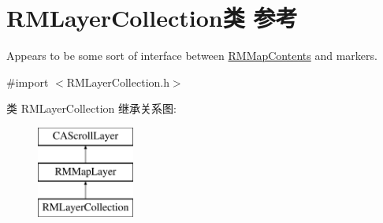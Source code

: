 \hypertarget{interface_r_m_layer_collection}{\section{R\-M\-Layer\-Collection类 参考}
\label{interface_r_m_layer_collection}
}


Appears to be some sort of interface between \hyperlink{interface_r_m_map_contents}{R\-M\-Map\-Contents} and markers.  




{\ttfamily \#import $<$R\-M\-Layer\-Collection.\-h$>$}

类 R\-M\-Layer\-Collection 继承关系图\-:\begin{figure}[H]
\begin{center}
\leavevmode
\includegraphics[height=3.000000cm]{interface_r_m_layer_collection}
\end{center}
\end{figure}

